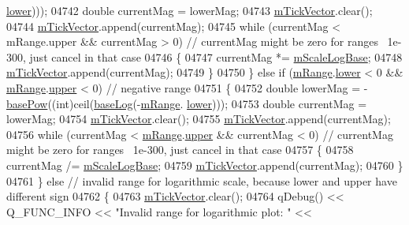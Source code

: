 \begin{DoxyCode}
      \hyperlink{a00049_aa3aca3edb14f7ca0c85d912647b91745}{lower})));
04742       \textcolor{keywordtype}{double} currentMag = lowerMag;
04743       \hyperlink{a00025_aae0f9b9973b85be601200f00f5825087}{mTickVector}.clear();
04744       \hyperlink{a00025_aae0f9b9973b85be601200f00f5825087}{mTickVector}.append(currentMag);
04745       \textcolor{keywordflow}{while} (currentMag < mRange.upper && currentMag > 0) \textcolor{comment}{// currentMag might be zero for ranges ~1e-300,
       just cancel in that case}
04746       \{
04747         currentMag *= \hyperlink{a00025_abc727ddb4af745151755d1b5e60d03c3}{mScaleLogBase};
04748         \hyperlink{a00025_aae0f9b9973b85be601200f00f5825087}{mTickVector}.append(currentMag);
04749       \}
04750     \} \textcolor{keywordflow}{else} \textcolor{keywordflow}{if} (\hyperlink{a00025_a1ee36773c49062d751560e11f90845f7}{mRange}.\hyperlink{a00049_aa3aca3edb14f7ca0c85d912647b91745}{lower} < 0 && \hyperlink{a00025_a1ee36773c49062d751560e11f90845f7}{mRange}.\hyperlink{a00049_ae44eb3aafe1d0e2ed34b499b6d2e074f}{upper} < 0) \textcolor{comment}{// negative range}
04751     \{
04752       \textcolor{keywordtype}{double} lowerMag = -\hyperlink{a00025_a97d69f021a05126fcb978d0aefea47b8}{basePow}((\textcolor{keywordtype}{int})ceil(\hyperlink{a00025_a1385765db2419ee5fb5505a6cf9130fb}{baseLog}(-\hyperlink{a00025_a1ee36773c49062d751560e11f90845f7}{mRange}.
      \hyperlink{a00049_aa3aca3edb14f7ca0c85d912647b91745}{lower})));
04753       \textcolor{keywordtype}{double} currentMag = lowerMag;
04754       \hyperlink{a00025_aae0f9b9973b85be601200f00f5825087}{mTickVector}.clear();
04755       \hyperlink{a00025_aae0f9b9973b85be601200f00f5825087}{mTickVector}.append(currentMag);
04756       \textcolor{keywordflow}{while} (currentMag < \hyperlink{a00025_a1ee36773c49062d751560e11f90845f7}{mRange}.\hyperlink{a00049_ae44eb3aafe1d0e2ed34b499b6d2e074f}{upper} && currentMag < 0) \textcolor{comment}{// currentMag might be zero for ranges
       ~1e-300, just cancel in that case}
04757       \{
04758         currentMag /= \hyperlink{a00025_abc727ddb4af745151755d1b5e60d03c3}{mScaleLogBase};
04759         \hyperlink{a00025_aae0f9b9973b85be601200f00f5825087}{mTickVector}.append(currentMag);
04760       \}
04761     \} \textcolor{keywordflow}{else} \textcolor{comment}{// invalid range for logarithmic scale, because lower and upper have different sign}
04762     \{
04763       \hyperlink{a00025_aae0f9b9973b85be601200f00f5825087}{mTickVector}.clear();
04764       qDebug() << Q\_FUNC\_INFO << \textcolor{stringliteral}{"Invalid range for logarithmic plot: "} << 

\end{DoxyCode}
